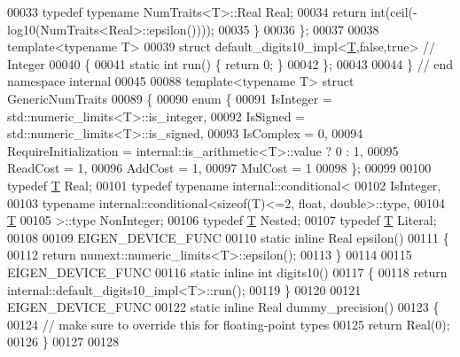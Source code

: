 \begin{DoxyCode}
00033     \textcolor{keyword}{typedef} \textcolor{keyword}{typename} NumTraits<T>::Real Real;
00034     \textcolor{keywordflow}{return} int(ceil(-log10(NumTraits<Real>::epsilon())));
00035   \}
00036 \};
00037 
00038 \textcolor{keyword}{template}<\textcolor{keyword}{typename} T>
00039 \textcolor{keyword}{struct }default\_digits10\_impl<\hyperlink{group___sparse_core___module_class_eigen_1_1_triplet}{T},false,true> \textcolor{comment}{// Integer}
00040 \{
00041   \textcolor{keyword}{static} \textcolor{keywordtype}{int} run() \{ \textcolor{keywordflow}{return} 0; \}
00042 \};
00043 
00044 \} \textcolor{comment}{// end namespace internal}
00045 
00088 \textcolor{keyword}{template}<\textcolor{keyword}{typename} T> \textcolor{keyword}{struct }GenericNumTraits
00089 \{
00090   \textcolor{keyword}{enum} \{
00091     IsInteger = std::numeric\_limits<T>::is\_integer,
00092     IsSigned = std::numeric\_limits<T>::is\_signed,
00093     IsComplex = 0,
00094     RequireInitialization = internal::is\_arithmetic<T>::value ? 0 : 1,
00095     ReadCost = 1,
00096     AddCost = 1,
00097     MulCost = 1
00098   \};
00099 
00100   \textcolor{keyword}{typedef} \hyperlink{group___sparse_core___module_class_eigen_1_1_triplet}{T} Real;
00101   \textcolor{keyword}{typedef} \textcolor{keyword}{typename} internal::conditional<
00102                      IsInteger,
00103                      \textcolor{keyword}{typename} internal::conditional<sizeof(T)<=2, float, double>::type,
00104                      \hyperlink{group___sparse_core___module_class_eigen_1_1_triplet}{T}
00105                    >::type NonInteger;
00106   \textcolor{keyword}{typedef} \hyperlink{group___sparse_core___module_class_eigen_1_1_triplet}{T} Nested;
00107   \textcolor{keyword}{typedef} \hyperlink{group___sparse_core___module_class_eigen_1_1_triplet}{T} Literal;
00108 
00109   EIGEN\_DEVICE\_FUNC
00110   \textcolor{keyword}{static} \textcolor{keyword}{inline} Real epsilon()
00111   \{
00112     \textcolor{keywordflow}{return} numext::numeric\_limits<T>::epsilon();
00113   \}
00114 
00115   EIGEN\_DEVICE\_FUNC
00116   \textcolor{keyword}{static} \textcolor{keyword}{inline} \textcolor{keywordtype}{int} digits10()
00117   \{
00118     \textcolor{keywordflow}{return} internal::default\_digits10\_impl<T>::run();
00119   \}
00120 
00121   EIGEN\_DEVICE\_FUNC
00122   \textcolor{keyword}{static} \textcolor{keyword}{inline} Real dummy\_precision()
00123   \{
00124     \textcolor{comment}{// make sure to override this for floating-point types}
00125     \textcolor{keywordflow}{return} Real(0);
00126   \}
00127 
00128 

\end{DoxyCode}
